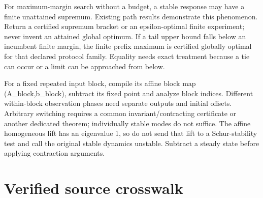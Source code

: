 \documentclass[
  11pt,
  a4paper,
]{report}
\begin{document}
For maximum-margin search without a budget, a stable response may have a
finite unattained supremum. Existing path results demonstrate this
phenomenon. Return a certified supremum bracket or an epsilon-optimal
finite experiment; never invent an attained global optimum. If a tail
upper bound falls below an incumbent finite margin, the finite prefix
maximum is certified globally optimal for that declared protocol family.
Equality needs exact treatment because a tie can occur or a limit can be
approached from below.

For a fixed repeated input block, compile its affine block map
(A\_block,b\_block), subtract its fixed point and analyze block indices.
Different within-block observation phases need separate outputs and
initial offsets. Arbitrary switching requires a common
invariant/contracting certificate or another dedicated theorem;
individually stable modes do not suffice. The affine homogeneous lift
has an eigenvalue 1, so do not send that lift to a Schur-stability test
and call the original stable dynamics unstable. Subtract a steady state
before applying contraction arguments.

\hypertarget{verified-source-crosswalk-1}{%
\section{Verified source crosswalk}\label{verified-source-crosswalk-1}}
\end{document}
